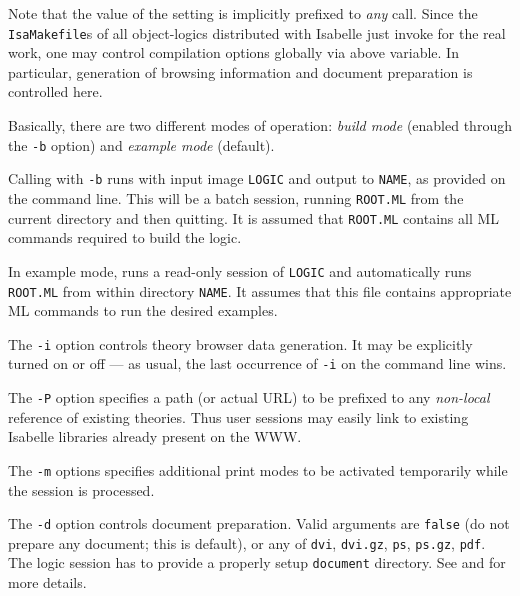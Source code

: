 \begin{isabellebody}
\begin{isamarkuptext}
  Note that the value of the \hyperlink{setting.ISABELLE-USEDIR-OPTIONS}{\mbox{}}
  setting is implicitly prefixed to \emph{any} \hyperlink{tool.usedir}{\mbox{}}
  call. Since the \verb|IsaMakefile|s of all object-logics
  distributed with Isabelle just invoke \hyperlink{tool.usedir}{\mbox{}} for the real
  work, one may control compilation options globally via above
  variable. In particular, generation of  browsing
  information and document preparation is controlled here.%
\end{isamarkuptext}%
\isamarkuptrue%
%
\isamarkuptrue%
%
\begin{isamarkuptext}%
Basically, there are two different modes of operation: \emph{build
  mode} (enabled through the \verb|-b| option) and
  \emph{example mode} (default).

  Calling \hyperlink{tool.usedir}{\mbox{}} with \verb|-b| runs \hyperlink{executable.isabelle-process}{\mbox{}} with input image \verb|LOGIC| and output to
  \verb|NAME|, as provided on the command line. This will be a
  batch session, running \verb|ROOT.ML| from the current
  directory and then quitting.  It is assumed that \verb|ROOT.ML|
  contains all ML commands required to build the logic.

  In example mode, \hyperlink{tool.usedir}{\mbox{}} runs a read-only session of
  \verb|LOGIC| and automatically runs \verb|ROOT.ML| from
  within directory \verb|NAME|.  It assumes that this file
  contains appropriate ML commands to run the desired examples.

  \medskip The \verb|-i| option controls theory browser data
  generation. It may be explicitly turned on or off --- as usual, the
  last occurrence of \verb|-i| on the command line wins.

  The \verb|-P| option specifies a path (or actual URL) to be
  prefixed to any \emph{non-local} reference of existing theories.
  Thus user sessions may easily link to existing Isabelle libraries
  already present on the WWW.

  The \verb|-m| options specifies additional print modes to be
  activated temporarily while the session is processed.

  \medskip The \verb|-d| option controls document preparation.
  Valid arguments are \verb|false| (do not prepare any document;
  this is default), or any of \verb|dvi|, \verb|dvi.gz|,
  \verb|ps|, \verb|ps.gz|, \verb|pdf|.  The logic
  session has to provide a properly setup \verb|document|
  directory.  See  and
   for more details.


\end{isamarkuptext}
\end{isabellebody}
